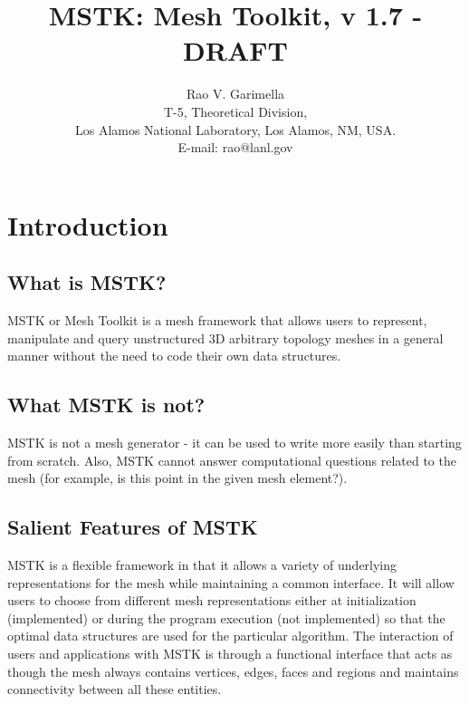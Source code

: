 \documentclass[12pt]{article}
\begin{document}
\title{MSTK: Mesh Toolkit, v 1.7 - DRAFT} 


\author{Rao V. Garimella \\
  T-5, Theoretical Division, \\
  Los Alamos National Laboratory, Los Alamos, NM, USA. \\ E-mail:
  rao@lanl.gov}

\maketitle

\thispagestyle{empty}
\setlength{\parindent}{0.0in}
\setlength{\parskip}{0.5em}

\newpage
\section{Introduction}

\subsection{What is MSTK?}
MSTK or Mesh Toolkit is a mesh framework that allows users to
represent, manipulate and query unstructured 3D arbitrary topology
meshes in a general manner without the need to code their own data
structures. 

\subsection{What MSTK is not?}

MSTK is not a mesh generator - it can be used to write more easily
than starting from scratch. Also, MSTK cannot answer computational
questions related to the mesh (for example, is this point in the given
mesh element?).

\subsection{Salient Features of MSTK}

MSTK is a flexible framework in that it allows a variety
of underlying representations for the mesh while maintaining a common
interface. It will allow users to choose from different mesh
representations either at initialization (implemented) or during the
program execution (not implemented) so that the optimal data
structures are used for the particular algorithm. The interaction of
users and applications with MSTK is through a functional interface
that acts as though the mesh always contains vertices, edges, faces
and regions and maintains connectivity between all these entities.
\end{document}
